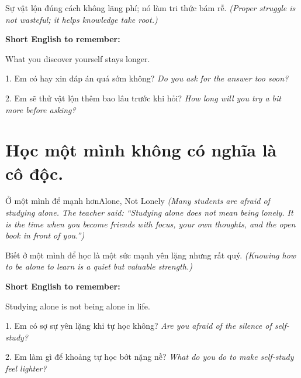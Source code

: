\begin{baihoc}
Sự vật lộn đúng cách không lãng phí; nó làm tri thức bám rễ.
\textit{(Proper struggle is not wasteful; it helps knowledge take root.)}
\end{baihoc}

\begin{ghinhoanh}
\textbf{Short English to remember:}

What you discover yourself stays longer.

\end{ghinhoanh}

\begin{tuhocnhanh}
1. Em có hay xin đáp án quá sớm không? \textit{Do you ask for the answer too soon?}

2. Em sẽ thử vật lộn thêm bao lâu trước khi hỏi? \textit{How long will you try a bit more before asking?}
\end{tuhocnhanh}
\ngancach

\section{Học một mình không có nghĩa là cô độc.}
\begin{truyen}{Ở một mình để mạnh hơn}{Alone, Not Lonely}
\textit{(Many students are afraid of studying alone. The teacher said: ``Studying alone does not mean being lonely. It is the time when you become friends with focus, your own thoughts, and the open book in front of you.'')}
\end{truyen}

\begin{baihoc}
Biết ở một mình để học là một sức mạnh yên lặng nhưng rất quý.
\textit{(Knowing how to be alone to learn is a quiet but valuable strength.)}
\end{baihoc}

\begin{ghinhoanh}
\textbf{Short English to remember:}

Studying alone is not being alone in life.

\end{ghinhoanh}

\begin{tuhocnhanh}
1. Em có sợ sự yên lặng khi tự học không? \textit{Are you afraid of the silence of self-study?}

2. Em làm gì để khoảng tự học bớt nặng nề? \textit{What do you do to make self-study feel lighter?}
\end{tuhocnhanh}
\ngancach


